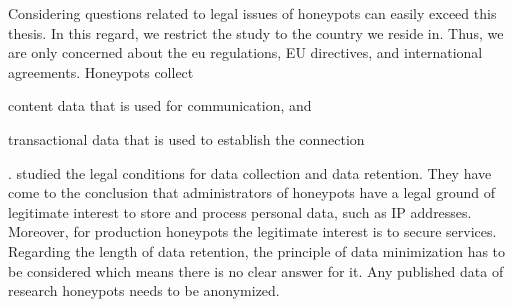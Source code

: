 Considering questions related to legal issues of honeypots can easily exceed this thesis.
In this regard, we restrict the study to the country we reside in.
Thus, we are only concerned about the \ac{eu} regulations, EU directives, and international agreements.
Honeypots collect
\begin{enumerate*}[label=(\roman*)]
    \item content data that is used for communication, and
    \item transactional data that is used to establish the connection
\end{enumerate*}.
\citet{sokol2017} studied the legal conditions for data collection and data retention.
They have come to the conclusion that administrators of honeypots have a legal ground of legitimate interest to store and process personal data, such as IP addresses.
Moreover, for production honeypots the legitimate interest is to secure services.
Regarding the length of data retention, the principle of data minimization has to be considered which means there is no clear answer for it.
Any published data of research honeypots needs to be anonymized.

%
%
%
